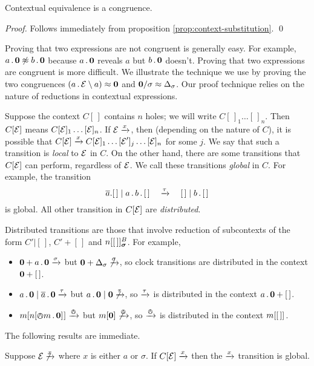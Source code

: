 \documentclass[orivec,envcountsame]{llncs}
\newcommand{\Eq}{\approx}
\newcommand{\NotEq}{\not\approx}
\newcommand{\Does}[1]{\xderives{#1}}
\begin{document}
\begin{theorem}
Contextual equivalence is a congruence.
\end{theorem}
\begin{proof}
Follows immediately from proposition \ref{prop:context-substitution}.
\qed \end{proof}


Proving that two expressions are not congruent is generally easy. For example, $a\pref\nil \NotEq b\pref\nil$ because $a\,.\,\textbf{0}$ reveals $a$ but $b\,.\,\textbf{0}$ doesn't. Proving that two expressions are congruent is more difficult. We illustrate the technique we use by proving the two congruences $\left(a\pref\expr \res{a}\right) \Eq \nil$ and $\nil \hide \sigma \Eq \Delta_\sigma$. Our proof technique relies on the nature of reductions in contextual expressions.

Suppose the context $C[\,]$ contains $n$ holes; we will write
$C[\,]_1\dots[\,]_n$. Then $C[\text{$\mathcal{E}$}]$ means $C[\text{$\mathcal{E}$}]_1\dots[\text{$\mathcal{E}$}]_n$. If
$\expr \Does{x}$, then (depending on the nature of $C$), it is possible that
$C[\expr] \Does{x} C[\expr]_1\dots[\expr']_j\dots[\expr]_n$ for some $j$. We say that
such a transition is \emph{local} to $\text{$\mathcal{E}$}$ in $C$. On the other hand, there
are some transitions that $C[\text{$\mathcal{E}$}]$ can perform, regardless of $\text{$\mathcal{E}$}$. We call
these transitions \emph{global} in $C$. For example, the transition 
\[
\out{a}.[\,] \mid a \pref b \pref [\,] \quad\Does{\tau}\quad [\,] \mid b \pref [\,] \]
is global. All other transition in $C[\text{$\mathcal{E}$}]$ are \emph{distributed}.

Distributed transitions are those that involve reduction of subcontexts of the form $C'|[\,]$, $C' + [\,]$ and $\locv{n}{[\,]}{B}{\vec{\sigma}}$. For example,
\begin{itemize}
\item
    $\nil + a\pref\nil \Does{\sigma}$ but $\nil + \Delta_\sigma \not\Does{\sigma}$, so clock transitions are distributed in the context $\textbf{0} + [\,]$.
\item
    $a\pref\nil \mid \out{a}\pref\nil \Does{\tau}$ but $a\pref\nil \mid \nil \not\Does{\tau}$, so $\Does{\tau}$ is distributed in the context $a\,.\,\textbf{0} + [\,]$.
\item
    $\locv{m}{ \locv{n}{\tntout{m}\pref\nil}{}{} }{}{} \Does{\tout}$ but
    $\locv{m}{ \nil }{}{} \not\Does{\tout}$, so $\Does{\tout}$ is distributed in the context ${m}[  [\,]  ]^{}_{}$.
\end{itemize}
The following results are immediate.

\begin{proposition}
Suppose $\expr \not\Does{x}$ where $x$ is either $a$ or $\sigma$. If $C[\expr] \Does{x}$ then the $\Does{x}$ transition is global.
\end{proposition}
\end{document}
